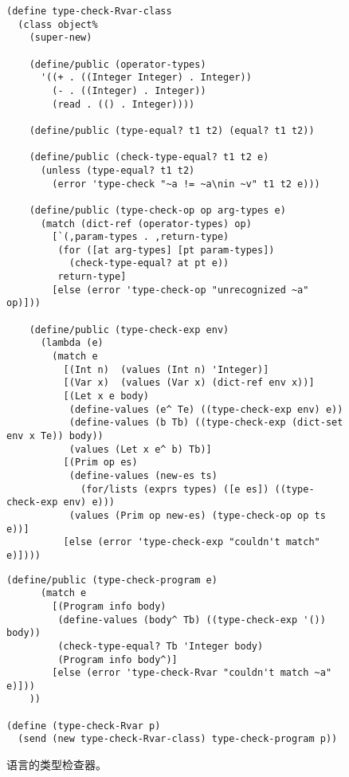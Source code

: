\documentclass[11pt]{book}
\begin{document}
\begin{figure}[tbp]
\begin{lstlisting}
(define type-check-Rvar-class
  (class object%
    (super-new)

    (define/public (operator-types)
      '((+ . ((Integer Integer) . Integer))
        (- . ((Integer) . Integer))
        (read . (() . Integer))))

    (define/public (type-equal? t1 t2) (equal? t1 t2))

    (define/public (check-type-equal? t1 t2 e)
      (unless (type-equal? t1 t2)
        (error 'type-check "~a != ~a\nin ~v" t1 t2 e)))

    (define/public (type-check-op op arg-types e)
      (match (dict-ref (operator-types) op)
        [`(,param-types . ,return-type)
         (for ([at arg-types] [pt param-types])
           (check-type-equal? at pt e))
         return-type]
        [else (error 'type-check-op "unrecognized ~a" op)]))

    (define/public (type-check-exp env)
      (lambda (e)
        (match e
          [(Int n)  (values (Int n) 'Integer)]
          [(Var x)  (values (Var x) (dict-ref env x))]
          [(Let x e body)
           (define-values (e^ Te) ((type-check-exp env) e))
           (define-values (b Tb) ((type-check-exp (dict-set env x Te)) body))
           (values (Let x e^ b) Tb)]
          [(Prim op es)
           (define-values (new-es ts)
             (for/lists (exprs types) ([e es]) ((type-check-exp env) e)))
           (values (Prim op new-es) (type-check-op op ts e))]
          [else (error 'type-check-exp "couldn't match" e)])))
\end{lstlisting}
\end{figure}
\begin{figure}[tbp]
\begin{lstlisting}[basicstyle=\ttfamily\footnotesize]
    (define/public (type-check-program e)
      (match e
        [(Program info body)
         (define-values (body^ Tb) ((type-check-exp '()) body))
         (check-type-equal? Tb 'Integer body)
         (Program info body^)]
        [else (error 'type-check-Rvar "couldn't match ~a" e)]))
    ))

(define (type-check-Rvar p)
  (send (new type-check-Rvar-class) type-check-program p))
\end{lstlisting}
\caption{ \LangVar{} 语言的类型检查器。}
\label{fig:type-check-Rvar}
\end{figure}
\end{document}
